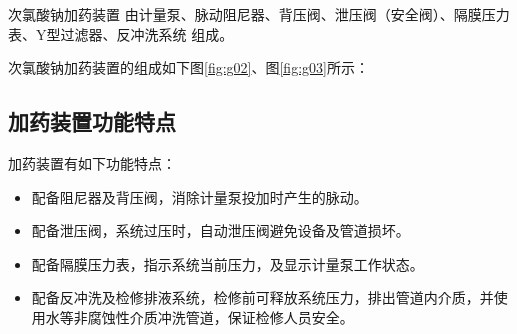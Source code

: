 
次氯酸钠加药装置
由计量泵、脉动阻尼器、背压阀、泄压阀（安全阀）、隔膜压力表、Y型过滤器、反冲洗系统
组成。
  
次氯酸钠加药装置的组成如下图\ref{fig:g02}、图\ref{fig:g03}所示：\\



\newpage



\subsection{加药装置功能特点}
    加药装置有如下功能特点：
    \begin{itemize}
         \item 配备阻尼器及背压阀，消除计量泵投加时产生的脉动。
         \item 配备泄压阀，系统过压时，自动泄压阀避免设备及管道损坏。
         \item 配备隔膜压力表，指示系统当前压力，及显示计量泵工作状态。
         \item 配备反冲洗及检修排液系统，检修前可释放系统压力，排出管道内介质，并使用水等非腐蚀性介质冲洗管道，保证检修人员安全。
    \end{itemize}



